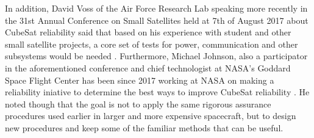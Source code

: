 \documentclass[english,12pt,a4paper,pdftex,elec,utf8]{aaltothesis}
\begin{document}
In addition, David Voss of the Air Force Research Lab speaking more recently in the 31st Annual Conference on Small Satellites held at 7th of August 2017 about CubeSat reliability said that based on his experience with student and other small satellite projects, a core set of tests for power, communication and other subsystems would be needed \cite{smallsatconf31}. Furthermore, Michael Johnson, also a participator in the aforementioned conference and chief technologist at NASA's Goddard Space Flight Center has been since 2017 working at NASA on making a reliability iniative to determine the best ways to improve CubeSat reliability \cite{smallsatconf31, ssvi}. He noted though that the goal is not to apply the same rigorous assurance procedures used earlier in larger and more expensive spacecraft, but to design new procedures and keep some of the familiar methods that can be useful. \par 
\end{document}
